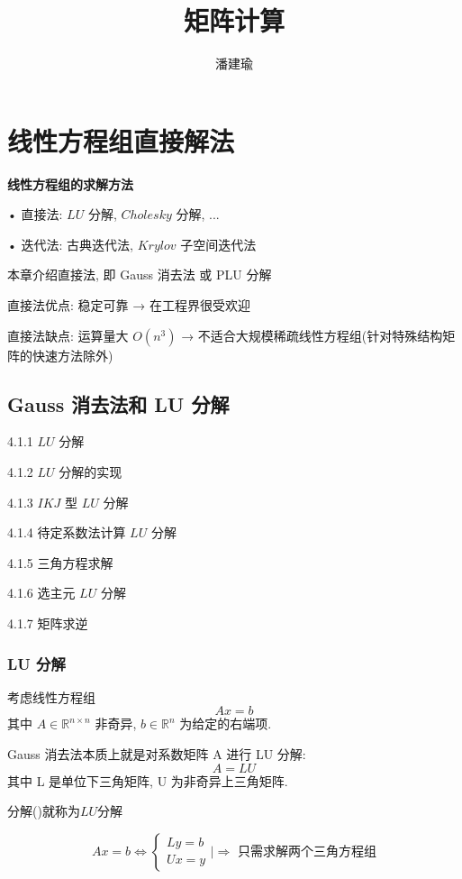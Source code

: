 \documentclass[12pt,a4paper]{article}
\title{矩阵计算}
\author{潘建瑜}
\begin{document}
\section{线性方程组直接解法}

{\bfseries 线性方程组的求解方法}

• 直接法: $LU$ 分解, $Cholesky$ 分解, ...

• 迭代法: 古典迭代法, $Krylov$ 子空间迭代法

本章介绍直接法, 即 Gauss 消去法 或 PLU 分解

直接法优点: 稳定可靠 → 在工程界很受欢迎

直接法缺点: 运算量大 $O(n^3)$ → 不适合大规模稀疏线性方程组(针对特殊结构矩阵的快速方法除外)

\subsection{Gauss 消去法和 LU 分解}

4.1.1 $LU$ 分解

4.1.2 $LU$ 分解的实现

4.1.3 $IKJ$ 型 $LU$ 分解

4.1.4 待定系数法计算 $LU$ 分解

4.1.5 三角方程求解

4.1.6 选主元 $LU$ 分解

4.1.7 矩阵求逆

\subsubsection{LU 分解}
考虑线性方程组
\begin{equation}
A x=b
\end{equation}
其中 $A ∈ \mathbb{R}^{n×n}$ 非奇异, $b ∈ \mathbb{R}^n$ 为给定的右端项.

\begin{framed}
	Gauss 消去法本质上就是对系数矩阵 A 进行 LU 分解:
	\begin{equation}
	A=L U
	\end{equation}
	其中 L 是单位下三角矩阵, U 为非奇异上三角矩阵.
\end{framed}

分解()就称为$LU$分解

\begin{equation}
A x=b \Longleftrightarrow\left\{\begin{array}{l}{L y=b} \\ {U x=y}\end{array} | \Longrightarrow \text{ 只需求解两个三角方程组} \right.
\end{equation}
\end{document}
